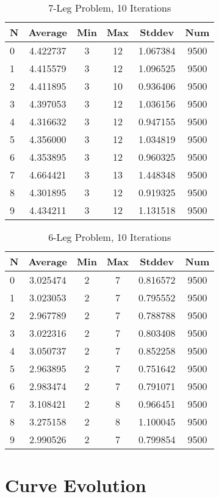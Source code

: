 \documentclass{article}
\begin{document}
\begin{table}
\centering
\begin{tabular}{|l|c|c|c|c|c|}
\hline
N & Average & Min & Max & Stddev & Num \\
\hline
0 & 4.422737 & 3 & 12 & 1.067384 & 9500 \\ 
1 & 4.415579 & 3 & 12 & 1.096525 & 9500 \\ 
2 & 4.411895 & 3 & 10 & 0.936406 & 9500 \\ 
3 & 4.397053 & 3 & 12 & 1.036156 & 9500 \\ 
4 & 4.316632 & 3 & 12 & 0.947155 & 9500 \\ 
5 & 4.356000 & 3 & 12 & 1.034819 & 9500 \\ 
6 & 4.353895 & 3 & 12 & 0.960325 & 9500 \\ 
7 & 4.664421 & 3 & 13 & 1.448348 & 9500 \\ 
8 & 4.301895 & 3 & 12 & 0.919325 & 9500 \\ 
9 & 4.434211 & 3 & 12 & 1.131518 & 9500 \\
\hline
\end{tabular}
\caption{7-Leg Problem, 10 Iterations}
\label{tab:template}
\end{table}

\begin{table}
\centering
\begin{tabular}{|l|c|c|c|c|c|}
\hline
N & Average & Min & Max & Stddev & Num \\
\hline
0 & 3.025474 & 2 & 7 & 0.816572 & 9500 \\ 
1 & 3.023053 & 2 & 7 & 0.795552 & 9500 \\ 
2 & 2.967789 & 2 & 7 & 0.788788 & 9500 \\ 
3 & 3.022316 & 2 & 7 & 0.803408 & 9500 \\ 
4 & 3.050737 & 2 & 7 & 0.852258 & 9500 \\ 
5 & 2.963895 & 2 & 7 & 0.751642 & 9500 \\ 
6 & 2.983474 & 2 & 7 & 0.791071 & 9500 \\ 
7 & 3.108421 & 2 & 8 & 0.966451 & 9500 \\ 
8 & 3.275158 & 2 & 8 & 1.100045 & 9500 \\ 
9 & 2.990526 & 2 & 7 & 0.799854 & 9500 \\
\hline
\end{tabular}
\caption{6-Leg Problem, 10 Iterations}
\label{tab:template}
\end{table}

\clearpage
\section{Curve Evolution}
\end{document}
